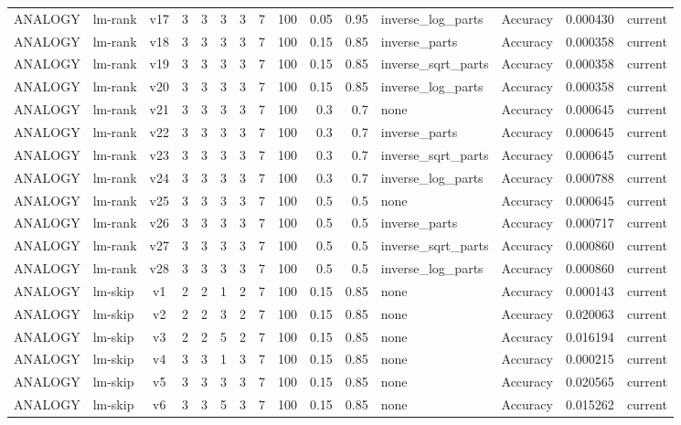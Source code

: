 \documentclass{article}
\begin{document}
\begin{xltabular}{\linewidth}{@{}lYcrrrrrrrrYlrl@{}}
ANALOGY & lm-rank & v17 & 3 & 3 & 3 & 3 & 7 & 100 & 0.05 & 0.95 & inverse\_log\_parts & Accuracy & 0.000430 & current \\
ANALOGY & lm-rank & v18 & 3 & 3 & 3 & 3 & 7 & 100 & 0.15 & 0.85 & inverse\_parts & Accuracy & 0.000358 & current \\
ANALOGY & lm-rank & v19 & 3 & 3 & 3 & 3 & 7 & 100 & 0.15 & 0.85 & inverse\_sqrt\_parts & Accuracy & 0.000358 & current \\
ANALOGY & lm-rank & v20 & 3 & 3 & 3 & 3 & 7 & 100 & 0.15 & 0.85 & inverse\_log\_parts & Accuracy & 0.000358 & current \\
ANALOGY & lm-rank & v21 & 3 & 3 & 3 & 3 & 7 & 100 & 0.3 & 0.7 & none & Accuracy & 0.000645 & current \\
ANALOGY & lm-rank & v22 & 3 & 3 & 3 & 3 & 7 & 100 & 0.3 & 0.7 & inverse\_parts & Accuracy & 0.000645 & current \\
ANALOGY & lm-rank & v23 & 3 & 3 & 3 & 3 & 7 & 100 & 0.3 & 0.7 & inverse\_sqrt\_parts & Accuracy & 0.000645 & current \\
ANALOGY & lm-rank & v24 & 3 & 3 & 3 & 3 & 7 & 100 & 0.3 & 0.7 & inverse\_log\_parts & Accuracy & 0.000788 & current \\
ANALOGY & lm-rank & v25 & 3 & 3 & 3 & 3 & 7 & 100 & 0.5 & 0.5 & none & Accuracy & 0.000645 & current \\
ANALOGY & lm-rank & v26 & 3 & 3 & 3 & 3 & 7 & 100 & 0.5 & 0.5 & inverse\_parts & Accuracy & 0.000717 & current \\
ANALOGY & lm-rank & v27 & 3 & 3 & 3 & 3 & 7 & 100 & 0.5 & 0.5 & inverse\_sqrt\_parts & Accuracy & 0.000860 & current \\
ANALOGY & lm-rank & v28 & 3 & 3 & 3 & 3 & 7 & 100 & 0.5 & 0.5 & inverse\_log\_parts & Accuracy & 0.000860 & current \\
ANALOGY & lm-skip & v1 & 2 & 2 & 1 & 2 & 7 & 100 & 0.15 & 0.85 & none & Accuracy & 0.000143 & current \\
ANALOGY & lm-skip & v2 & 2 & 2 & 3 & 2 & 7 & 100 & 0.15 & 0.85 & none & Accuracy & 0.020063 & current \\
ANALOGY & lm-skip & v3 & 2 & 2 & 5 & 2 & 7 & 100 & 0.15 & 0.85 & none & Accuracy & 0.016194 & current \\
ANALOGY & lm-skip & v4 & 3 & 3 & 1 & 3 & 7 & 100 & 0.15 & 0.85 & none & Accuracy & 0.000215 & current \\
ANALOGY & lm-skip & v5 & 3 & 3 & 3 & 3 & 7 & 100 & 0.15 & 0.85 & none & Accuracy & 0.020565 & current \\
ANALOGY & lm-skip & v6 & 3 & 3 & 5 & 3 & 7 & 100 & 0.15 & 0.85 & none & Accuracy & 0.015262 & current \\

\end{xltabular}
\end{document}
